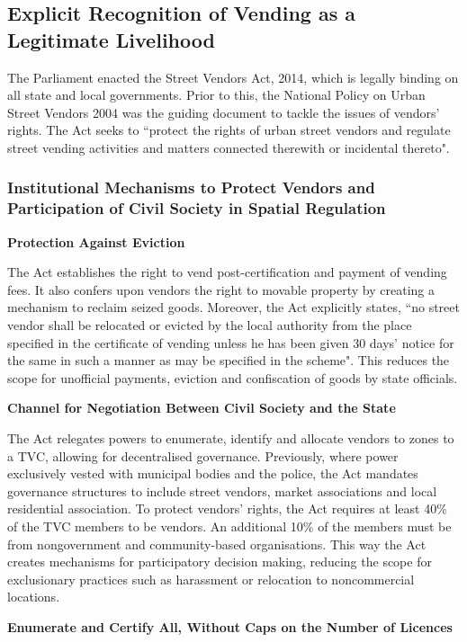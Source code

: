 \documentclass[a4paper, 12pt, twoside]{article}
\begin{document}
{\subsection*{Explicit Recognition of Vending as a Legitimate Livelihood}

The Parliament enacted the Street Vendors Act, 2014, which is legally binding on all state and local governments. Prior to this, the National Policy on Urban Street Vendors 2004 was the guiding document to tackle the issues of vendors’ rights. The Act seeks to “protect the rights of urban street vendors and regulate street vending activities and matters connected therewith or incidental thereto".

\subsubsection*{Institutional Mechanisms to Protect Vendors and Participation of Civil Society in Spatial Regulation}

\textbf{Protection Against Eviction}

The Act establishes the right to vend post-certification and payment of vending fees. It also confers upon vendors the right to movable property by creating a mechanism to reclaim seized goods. Moreover, the Act explicitly states, “no street vendor shall be relocated or evicted by the local authority from the place specified in the certificate of vending unless he has been given 30 days’ notice for the same in such a manner as may be specified in the scheme". This reduces the scope for unofficial payments, eviction and confiscation of goods by state officials.

\textbf{Channel for Negotiation Between Civil Society and the State}

The Act relegates powers to enumerate, identify and allocate vendors to zones to a TVC, allowing for decentralised governance. Previously, where power exclusively vested with municipal bodies and the police, the Act mandates governance structures to include street vendors, market associations and local residential association. To protect vendors’ rights, the Act requires at least 40\% of the TVC members to be vendors. An additional 10\% of the members must be from nongovernment and community-based organisations. This way the Act creates mechanisms for participatory decision making, reducing the scope for exclusionary practices such as harassment or relocation to noncommercial locations.

\textbf{Enumerate and Certify All, Without Caps on the Number of Licences}

}
\end{document}
